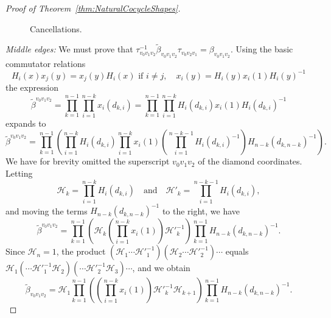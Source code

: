 \documentclass[12pt]{amsart}
\theoremstyle{definition}
\numberwithin{equation}{section}
\begin{document}
\begin{proof}[Proof of Theorem~\ref{thm:NaturalCocycleShapes}]
\begin{figure}[htb]
\begin{center}
\scalebox{0.75}{
}
\end{center}
\caption{Cancellations.}\label{fig:Cancellations}
\end{figure}

\textit{Middle edges:} We must prove that $\tau^{-1}_{v_0v_1v_2}\widetilde\beta_{v_0v_1v_2}\tau_{v_0v_2v_1}=\beta_{v_0v_1v_2}$.
Using the basic commutator relations
\begin{equation}\label{eq:CommutatorRelations}
H_i(x)x_j(y)=x_j(y)H_i(x) \text{ if } i\neq j, \quad x_i(y)=H_i(y)x_i(1)H_i(y)^{-1}
\end{equation}
the expression
\begin{equation}
\widetilde\beta^{v_0v_1v_2}=\prod_{k=1}^{n-1}\prod_{i=1}^{n-k}x_i(d_{k,i})=\prod_{k=1}^{n-1}\prod_{i=1}^{n-k}H_i(d_{k,i})x_i(1)H_i(d_{k,i})^{-1}
\end{equation}
expands to
\begin{equation}\label{eq:AuxMiddle1}
\widetilde\beta^{v_0v_1v_2}=\prod_{k=1}^{n-1}\left(\prod_{i=1}^{n-k}H_i(d_{k,i})\prod_{i=1}^{n-k}x_i(1)\left(\prod_{i=1}^{n-k-1}H_i(d_{k,i})^{-1}\right) H_{n-k}(d_{k,n-k})^{-1}\right).
\end{equation}
We have for brevity omitted the superscript $v_0v_1v_2$ of the diamond coordinates. Letting $$\mathcal H_k=\prod_{i=1}^{n-k}H_i(d_{k,i})\quad\mbox{and}\quad \mathcal H'_k=\prod_{i=1}^{n-k-1}H_i(d_{k,i}),$$
and moving the terms $H_{n-k}(d_{k,n-k})^{-1}$ to the right, we have
\begin{equation}
\widetilde\beta^{v_0v_1v_2}=\prod_{k=1}^{n-1}\left(\mathcal H_k\left(\prod_{i=1}^{n-k}x_i(1)\right)\mathcal H'^{-1}_k\right) \prod_{k=1}^{n-1}  H_{n-k}(d_{k,n-k})^{-1}.
\end{equation}
Since $\mathcal H_n=1$, the product $(\mathcal H_1\cdots \mathcal H'^{-1}_1)(\mathcal H_2 \cdots \mathcal H'^{-1}_2)\cdots$ equals $\mathcal H_1 (\cdots \mathcal H'^{-1}_1 \mathcal H_2)(\cdots \mathcal H'^{-1}_2 \mathcal H_3)\cdots$, and we obtain 
\begin{equation}
\widetilde\beta_{v_0v_1v_2}=\mathcal{H}_1\prod_{k=1}^{n-1}\left(\left(\prod_{i=1}^{n-k}x_i(1)\right)\mathcal H'^{-1}_k \mathcal H_{k+1}\right) \prod_{k=1}^{n-1}  H_{n-k}(d_{k,n-k})^{-1}.

\end{equation}
\end{proof}
\end{document}
